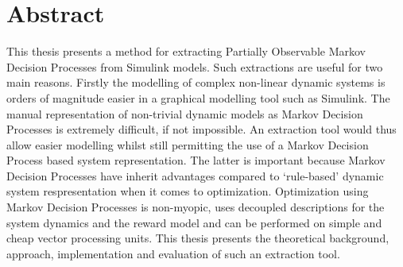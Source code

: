 \chapter*{Abstract}


This thesis presents a method for extracting Partially Observable Markov Decision Processes from Simulink models. Such extractions are useful for two main reasons. Firstly the modelling of complex non-linear dynamic systems is orders of magnitude easier in a graphical modelling tool such as Simulink. The manual representation of non-trivial dynamic models as Markov Decision Processes is extremely difficult, if not impossible. An extraction tool would thus allow easier modelling whilst still permitting the use of a Markov Decision Process based system representation. The latter is important because Markov Decision Processes have inherit advantages compared to `rule-based' dynamic system respresentation when it comes to optimization. Optimization using Markov Decision Processes is non-myopic, uses decoupled descriptions for the system dynamics and the reward model and can be performed on simple and cheap vector processing units. This thesis presents the theoretical background, approach, implementation and evaluation of such an extraction tool.

%
%
